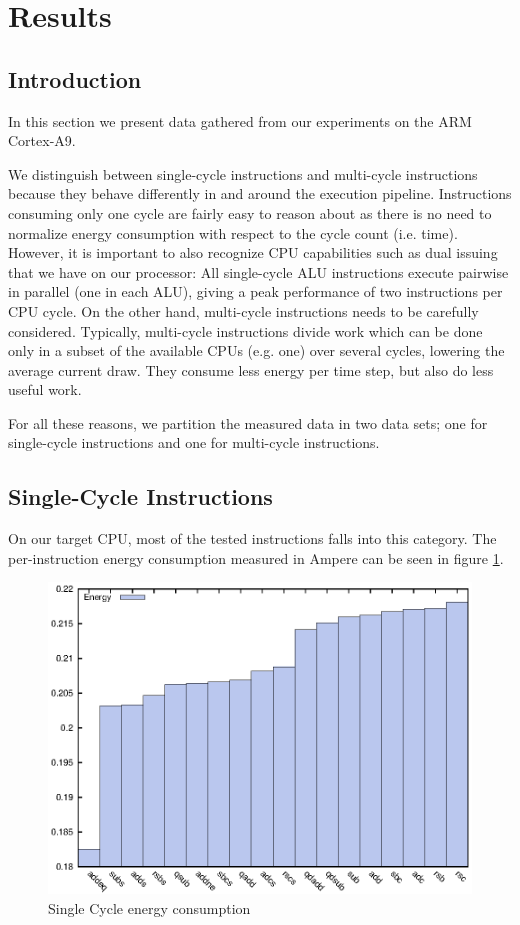 \section{Results}

\subsection{Introduction}
In this section we present data gathered from our experiments on the ARM
Cortex-A9.

We distinguish between single-cycle instructions and multi-cycle instructions
because they behave differently in and around the execution pipeline.
Instructions consuming only one cycle are fairly easy to reason about as there
is no need to normalize energy consumption with respect to the cycle count (i.e.
time). However, it is important to also recognize CPU capabilities such as dual
issuing that we have on our processor: All single-cycle ALU instructions execute
pairwise in parallel (one in each ALU), giving a peak performance of two
instructions per CPU cycle. On the other hand, multi-cycle instructions needs to
be carefully considered. Typically, multi-cycle instructions divide work which
can be done only in a subset of the available CPUs (e.g. one) over several
cycles, lowering the average current draw. They consume less energy per
time step, but also do less useful work.

For all these reasons, we partition the measured data in two data sets; one for
single-cycle instructions and one for multi-cycle instructions.

\subsection{Single-Cycle Instructions}
On our target CPU, most of  the tested instructions falls into
this category. The per-instruction energy consumption measured in Ampere can be
seen in figure \ref{fig:singlecycle}.

\begin{figure}
    \includegraphics[width=\textwidth/2]{figures/single-cycle}
    \caption{Single Cycle energy consumption}
    \label{fig:singlecycle}
\end{figure}

